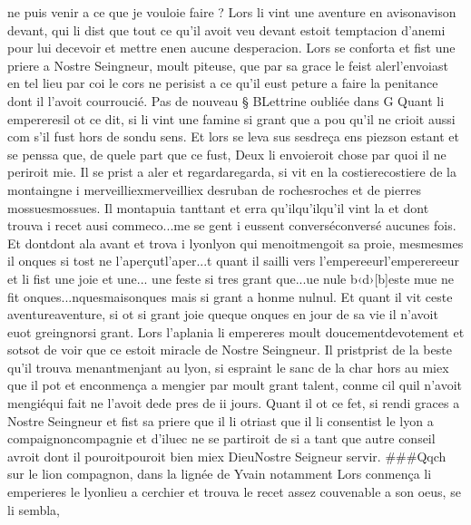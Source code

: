 \documentclass{article}
\begin{document}
\begin{pages}
      ne puis venir a ce que je vouloie faire ?
   Lors li vint une aventure en 
   avisonavison devant, qui li dist que 
   tout ce qu’il avoit veu devant 
      estoit temptacion d’anemi pour lui decevoir et mettre enen aucune desperacion. 
   Lors se conforta et fist une priere a Nostre Seingneur, moult piteuse, que 
   par sa grace le feist alerl'envoiast en 
      tel lieu par coi le cors ne perisist a ce qu’il 
      eust peture a faire la penitance dont il l’avoit courroucié. \pend
\pstart Pas de nouveau § BLettrine oubliée dans G
   Quant 
   li empereresil ot ce dit, 
   si li vint une famine si grant que a pou qu’il ne crioit aussi com s’il fust hors de sondu sens. 
   Et lors se leva sus sesdreça ens 
   piezson estant et se penssa que, 
   de quele part que ce fust, Deux li envoieroit chose par quoi il ne periroit mie. 
   Il se prist a aler et regardaregarda, 
   si vit en la costierecostiere
   de la montaingne i merveilliexmerveilliex 
   desruban de rochesroches 
   et de pierres mossuesmossues. 
   Il montapuia 
   tanttant et erra 
   qu’ilqu’ilqu'il vint la et dont 
   trouva i recet ausi 
   commeco...me se gent i eussent 
   converséconversé aucunes fois. 
   Et dontdont ala avant et trova i 
   lyonlyon qui 
   menoitmengoit sa proie, 
   mesmesmes il onques si tost ne 
   l'aperçutl'aper...t quant 
   il sailli vers 
   l'empereeurl’emperereeur 
   et li fist une joie et une... une feste si 
   tres grant 
   que...ue nule 
   b‹d›[b]este 
   mue ne fit 
   onques...nquesmaisonques mais si grant a honme 
   nulnul. 
   Et quant il vit ceste aventureaventure, 
   si ot si grant joie queque 
   onques en 
   jour de sa vie il n’avoit euot 
   greingnorsi grant. 
   Lors l’aplania li empereres moult 
   doucementdevotement et 
   sotsot de voir que ce estoit miracle de 
   Nostre Seingneur. Il pristprist de la beste qu’il trouva 
   menantmenjant au lyon, 
   si espraint le sanc de la char hors au miex que il pot et enconmença a mengier par moult grant talent, 
   conme cil quil n’avoit mengiéqui fait ne l'avoit 
   dede pres de ii jours. Quant il ot ce fet, 
   si rendi graces a Nostre Seingneur et fist sa priere que 
   il li otriast que il li consentist 
      le lyon a compaignoncompagnie 
      et d’iluec ne se partiroit de si a tant que autre conseil avroit dont il 
      pouroitpouroit bien miex 
      DieuNostre Seigneur servir.
   ###Qqch sur le lion compagnon, dans la lignée de Yvain notamment \pend
\pstart Lors conmença li emperieres
   le lyonlieu 
   a cerchier et trouva le recet 
   assez couvenable a son oeus, se li sembla, 

\end{pages}
\end{document}
